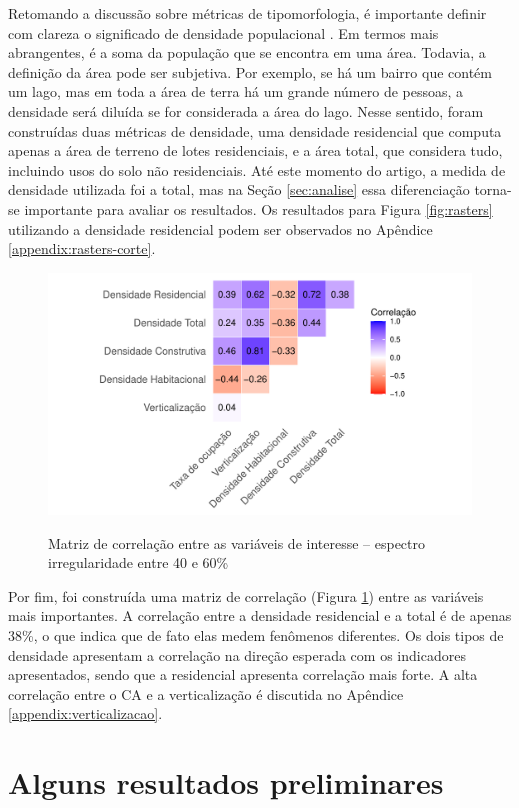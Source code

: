 Retomando a discussão sobre métricas de tipomorfologia, é importante definir com clareza o significado de densidade populacional \cite{ccalicskan2022morphological}. Em termos mais abrangentes, é a soma da população que se encontra em uma área. Todavia, a definição da área pode ser subjetiva. Por exemplo, se há um bairro que contém um lago, mas em toda a área de terra há um grande número de pessoas, a densidade será diluída se for considerada a área do lago. Nesse sentido, foram construídas duas métricas de densidade, uma densidade residencial que computa apenas a área de terreno de lotes residenciais, e a área total, que considera tudo, incluindo usos do solo não residenciais. Até este momento do artigo, a medida de densidade utilizada foi a total, mas na Seção \ref{sec:analise} essa diferenciação torna-se importante para avaliar os resultados. Os resultados para Figura \ref{fig:rasters} utilizando a densidade residencial podem ser observados no Apêndice \ref{appendix:rasters-corte}.

\begin{figure}[!h]
    \centering
    \caption{Matriz de correlação entre as variáveis de interesse -- espectro irregularidade entre 40 e 60\%}
    \includegraphics[width = .75\textwidth]{imagens/corrplot.pdf}
    \label{fig:corplot}
\end{figure}

Por fim, foi construída uma matriz de correlação (Figura \ref{fig:corplot}) entre as variáveis mais importantes. A correlação entre a densidade residencial e a total é de apenas 38\%, o que indica que de fato elas medem fenômenos diferentes. Os dois tipos de densidade apresentam a correlação na direção esperada com os indicadores apresentados, sendo que a residencial apresenta correlação mais forte. A alta correlação entre o CA e a verticalização é discutida no Apêndice \ref{appendix:verticalizacao}.

\section{Alguns resultados preliminares}
\label{sec:dados-res}

